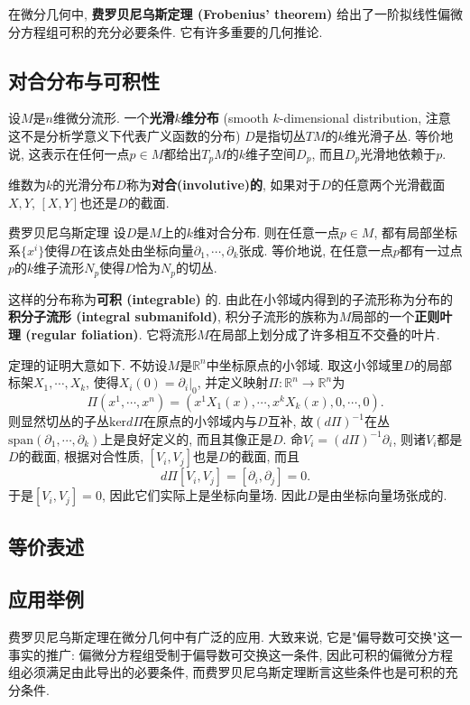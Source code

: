 
在微分几何中, \textbf{费罗贝尼乌斯定理 (Frobenius' theorem)} 给出了一阶拟线性偏微分方程组可积的充分必要条件. 它有许多重要的几何推论.

\subsection{对合分布与可积性}
设$M$是$n$维微分流形. 一个\textbf{光滑$k$维分布} (smooth $k$-dimensional distribution, 注意这不是分析学意义下代表广义函数的分布) $D$是指切丛$TM$的$k$维光滑子丛. 等价地说, 这表示在任何一点$p\in M$都给出$T_pM$的$k$维子空间$D_p$, 而且$D_p$光滑地依赖于$p$. 

维数为$k$的光滑分布$D$称为\textbf{对合(involutive)的}, 如果对于$D$的任意两个光滑截面$X,Y$, $[X,Y]$也还是$D$的截面. 

\begin{theorem}{费罗贝尼乌斯定理}
设$D$是$M$上的$k$维对合分布. 则在任意一点$p\in M$, 都有局部坐标系$\{x^i\}$使得$D$在该点处由坐标向量$\partial_1,\cdots ,\partial_k$张成. 等价地说, 在任意一点$p$都有一过点$p$的$k$维子流形$N_p$使得$D$恰为$N_p$的切丛.
\end{theorem}
这样的分布称为\textbf{可积 (integrable)} 的. 由此在小邻域内得到的子流形称为分布的\textbf{积分子流形 (integral submanifold)}, 积分子流形的族称为$M$局部的一个\textbf{正则叶理 (regular foliation)}. 它将流形$M$在局部上划分成了许多相互不交叠的叶片.

定理的证明大意如下. 不妨设$M$是$\mathbb{R}^n$中坐标原点的小邻域. 取这小邻域里$D$的局部标架$X_1,\cdots ,X_k$, 使得$X_i(0)=\partial_i|_0$, 并定义映射$\Pi: \mathbb{R}^n\to \mathbb{R}^n$为
$$
\Pi(x^1,\cdots ,x^n)=(x^1X_1(x),\cdots ,x^kX_k(x),0,\cdots ,0).
$$
则显然切丛的子丛$\text{ker}d\Pi$在原点的小邻域内与$D$互补, 故$(d\Pi)^{-1}$在丛$\text{span}(\partial_1,\cdots ,\partial_k)$上是良好定义的, 而且其像正是$D$. 命$V_i=(d\Pi)^{-1}\partial_i$, 则诸$V_i$都是$D$的截面, 根据对合性质, $[V_i,V_j]$也是$D$的截面, 而且
$$
d\Pi[V_i,V_j]=[\partial_i,\partial_j]=0.
$$
于是$[V_i,V_j]=0$, 因此它们实际上是坐标向量场. 因此$D$是由坐标向量场张成的. 

\subsection{等价表述}

\subsection{应用举例}
费罗贝尼乌斯定理在微分几何中有广泛的应用. 大致来说, 它是"偏导数可交换"这一事实的推广: 偏微分方程组受制于偏导数可交换这一条件, 因此可积的偏微分方程组必须满足由此导出的必要条件, 而费罗贝尼乌斯定理断言这些条件也是可积的充分条件.

